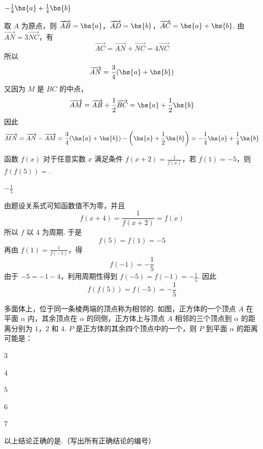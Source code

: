 \begin{answer}
\(-\frac{1}{4}\bs{a}+\frac{1}{4}\bs{b}\)
\end{answer}

\begin{solution}
取 \(A\) 为原点，则
\(\overrightarrow{AB}=\bs{a}\)，\(\overrightarrow{AD}=\bs{b}\)，\(\overrightarrow{AC}=\bs{a}+\bs{b}\).
由 \(\overrightarrow{AN}=3\overrightarrow{NC}\)，有
\[
\overrightarrow{AC}=\overrightarrow{AN}+\overrightarrow{NC}
=4\overrightarrow{NC}
\]
所以
\[
\overrightarrow{AN}=\frac34(\bs{a}+\bs{b})
\]
又因为 \(M\) 是 \(BC\) 的中点，
\[
\overrightarrow{AM}=\overrightarrow{AB}+\frac12\overrightarrow{BC}
=\bs{a}+\frac12\bs{b}
\]
因此
\[
\overrightarrow{MN}=\overrightarrow{AN}-\overrightarrow{AM}
=\frac34(\bs{a}+\bs{b})-\left(\bs{a}+\frac12\bs{b}\right)
=-\frac14\bs{a}+\frac14\bs{b}
\]
\end{solution}

\begin{problem}
函数 \(f(x)\) 对于任意实数 \(x\) 满足条件 \(f(x + 2) = \frac{1}{f(x)}\)，若 \(f(1) = -5\)，则 \(f(f(5)) = \)\fillinblank{}.
\end{problem}

\begin{answer}
\(-\frac{1}{5}\)
\end{answer}

\begin{solution}
由题设关系式可知函数值不为零，并且
\[
f(x+4)=\frac{1}{f(x+2)}=f(x)
\]
所以 \(f\) 以 \(4\) 为周期. 于是
\[
f(5)=f(1)=-5
\]
再由 \(f(1)=\frac{1}{f(-1)}\)，得
\[
f(-1)=-\frac15
\]
由于 \(-5=-1-4\)，利用周期性得到 \(f(-5)=f(-1)=-\frac{1}{5}\). 因此
\[
f(f(5))=f(-5)=-\frac15
\]
\end{solution}

\begin{problem}
多面体上，位于同一条棱两端的顶点称为相邻的. 如图，正方体的一个顶点 \(A\) 在平面 \(\alpha\) 内，其余顶点在 \(\alpha\) 的同侧，正方体上与顶点 \(A\) 相邻的三个顶点到 \(\alpha\) 的距离分别为 \(1\)，\(2\) 和 \(4\). \(P\) 是正方体的其余四个顶点中的一个，则 \(P\) 到平面 \(\alpha\) 的距离可能是：

\begin{circlelist}
\item \(3\)
\item \(4\)
\item \(5\)
\item \(6\)
\item \(7\)
\end{circlelist}

以上结论正确的是\fillinblank{}.（写出所有正确结论的编号）

\begingroup
\leftskip=0pt
\rightskip=0pt
\endgroup
\end{problem}

